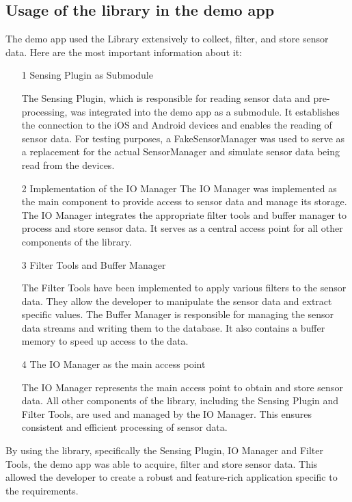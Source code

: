 \documentclass[12pt]{article}
\newcounter{fr}
\begin{document}
\subsection{Usage of the library in the demo app}
    The demo app used the Library extensively to collect, filter, and store sensor data. Here are the most important information about it:
    \begin{itemize}
        \item[1]Sensing Plugin as Submodule
        
        The Sensing Plugin, which is responsible for reading sensor data and pre-processing, was integrated into the demo app as a submodule. It establishes the connection to the iOS and Android devices and enables the reading of sensor data. For testing purposes, a FakeSensorManager was used to serve as a replacement for the actual SensorManager and simulate sensor data being read from the devices.
        \item[2] Implementation of the IO Manager
        The IO Manager was implemented as the main component to provide access to sensor data and manage its storage. The IO Manager integrates the appropriate filter tools and buffer manager to process and store sensor data. It serves as a central access point for all other components of the library.

        \item[3] Filter Tools and Buffer Manager

        The Filter Tools have been implemented to apply various filters to the sensor data. They allow the developer to manipulate the sensor data and extract specific values. The Buffer Manager is responsible for managing the sensor data streams and writing them to the database. It also contains a buffer memory to speed up access to the data.
        \item[4] The IO Manager as the main access point

        The IO Manager represents the main access point to obtain and store sensor data. All other components of the library, including the Sensing Plugin and Filter Tools, are used and managed by the IO Manager. This ensures consistent and efficient processing of sensor data.
      
        
  
    \end{itemize}
By using the library, specifically the Sensing Plugin, IO Manager and Filter Tools, the demo app was able to acquire, filter and store sensor data. This allowed the developer to create a robust and feature-rich application specific to the requirements.
\end{document}
